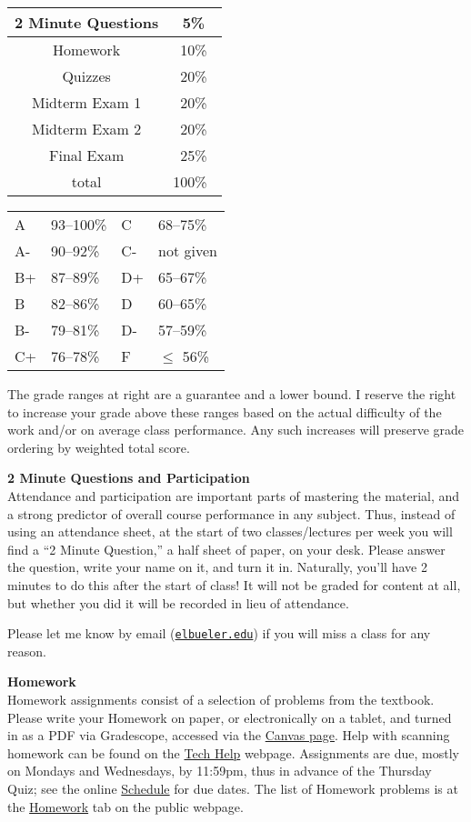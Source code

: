 \documentclass[12pt]{article}
\renewcommand{\emph}[1]{\textsf{\textbf{#1}}}
\newcommand{\localhead}[1]{\par\smallskip\textbf{#1} \smallskip\nobreak\\}%
\def\heading#1{\localhead{\large\emph{#1}}}
\begin{document}
\begin{multicols}{2}
\begin{tabular}{|c|c|}
\hline
2 Minute Questions & 5\%\\
\hline
Homework & 10\% \\
\hline
Quizzes & 20\% \\
\hline
Midterm Exam 1 & 20\% \\
\hline
Midterm Exam 2 & 20\%  \\
\hline
Final Exam & 25\% \\
\hline
total & 100\% \, \\
\hline
\end{tabular}


\begin{tabular}{llll}
A  & 93--100\%& C  & 68--75\%  \\
A- & 90--92\% & C- & not given \\
B+ & 87--89\% & D+ & 65--67\%  \\
B  & 82--86\% & D  & 60--65\%  \\
B- & 79--81\% & D- & 57--59\%  \\
C+ & 76--78\% & F  & $\le$ 56\%
\end{tabular}
\end{multicols}

The grade ranges at right are a guarantee and a lower bound. I reserve the right to increase your grade above these ranges based on the actual difficulty of the work and/or on average class performance.  Any such increases will preserve grade ordering by weighted total score. 


\heading{2 Minute Questions and Participation}
Attendance and participation are important parts of mastering the material, and a strong predictor of overall course performance in any subject.  Thus, instead of using an attendance sheet, at the start of two classes/lectures per week you will find a ``2 Minute Question,'' a half sheet of paper, on your desk.  Please answer the question, write your name on it, and turn it in.  Naturally, you'll have 2 minutes to do this after the start of class!  It will not be graded for content at all, but whether you did it will be recorded in lieu of attendance.

Please let me know by email (\href{mailto:elbueler@alaska.edu}{\texttt{elbueler\@@alaska.edu}}) if you will miss a class for any reason.


\heading{Homework}
Homework assignments consist of a selection of problems from the textbook.  Please write your Homework on paper, or electronically on a tablet, and turned in as a PDF via Gradescope, accessed via the \href{https://canvas.alaska.edu/courses/18805}{Canvas page}.  Help with scanning homework can be found on the \href{https://uaf-math251.github.io/calc2/techHelp.html}{Tech Help} webpage.  Assignments are due, mostly on Mondays and Wednesdays, by 11:59pm, thus in advance of the Thursday Quiz; see the online \href{https://uaf-math251.github.io/calc2/assets/general/S24/Bueler/schedule.pdf}{Schedule} for due dates.  The list of Homework problems is at the \href{https://uaf-math251.github.io/calc2/homework.html}{Homework} tab on the public webpage.
\end{document}
